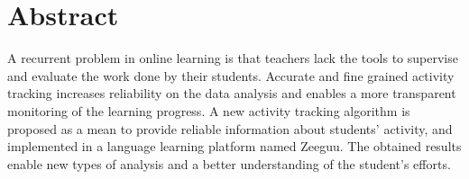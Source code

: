 \begingroup
\let\clearpage\relax
\let\cleardoublepage\relax
\let\cleardoublepage\relax

\chapter*{Abstract}
A recurrent problem in online learning is that teachers lack the tools to supervise and evaluate the work done by their students. Accurate and fine grained activity tracking increases reliability on the data analysis and enables a more transparent monitoring of the learning progress. A new activity tracking algorithm is proposed as a mean to provide reliable information about students' activity, and implemented in a language learning platform named Zeeguu. The obtained results enable new types of analysis and a better understanding of the student's efforts.




\vfill
%

\endgroup

\vfill
